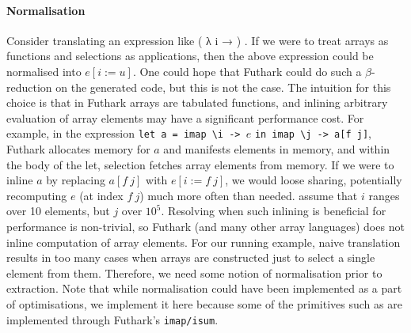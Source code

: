 \paragraph{Normalisation} Consider translating an expression like
 ( λ i → ) .  If we were to treat arrays
as functions and selections as applications, then the above expression
could be normalised into $e[i := u]$.  One could hope that Futhark could do
such a $\beta$-reduction on the generated code, but this is not the case.
The intuition for this choice is that in Futhark arrays are tabulated
functions, and inlining arbitrary evaluation of array elements may
have a significant performance cost.  For example, in the expression
\texttt{let a = imap \textbackslash i -> }$e$ \texttt{in imap \textbackslash j -> a[f j]}, Futhark
allocates memory for $a$ and manifests elements in memory, and within the
body of the let, selection fetches array elements from memory.  If we were
to inline $a$ by replacing $a[f\ j]$ with $e[i := f\ j]$, we would loose sharing,
potentially recomputing $e$ (at index $f\ j$) much more often than needed.
\Eg{} assume that $i$ ranges over 10 elements, but $j$ over $10^5$.
Resolving when such inlining is beneficial for performance is non-trivial,
so Futhark (and many other array languages) does not inline 
computation of array elements.  For our running example, naive translation
results in too many cases when arrays are constructed just to select
a single element from them.  Therefore, we need some notion of normalisation
prior to extraction.  Note that while normalisation could have been
implemented as a part of optimisations, we implement it here because
some of the  primitives such as  are implemented
through Futhark's \texttt{imap/isum}. 


